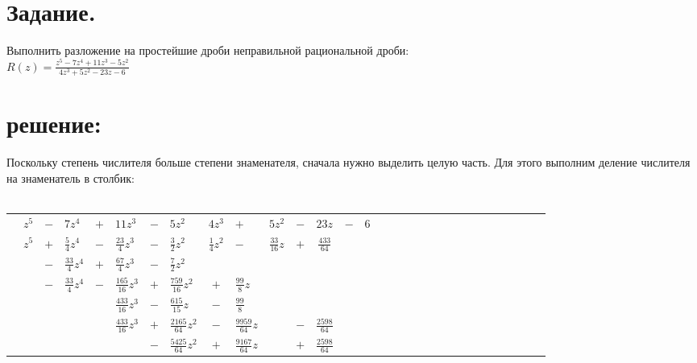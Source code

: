 \documentclass[12pt, a4paper]{article}
\begin{document}
\section{Задание.}
    Выполнить разложение на простейшие дроби неправильной рациональной дроби:\\
    $R(z) = \frac{z^5 - 7z^4 + 11z^3 - 5z^2}{4z^3 + 5z^2 - 23z - 6}$
    \section*{решение:}
    Поскольку степень числителя больше степени знаменателя, сначала
    нужно выделить целую часть. Для этого
    выполним деление числителя на знаменатель в столбик:\\\\
    \begin{spacing}{1.4}
        \begin{tabular}{*{15}{cp{0.55cm}}}
            &$z^5$             & $-$ & $7z^4$            & $+$ & $11z^3$             & $-$ & $5z^2$               &\vline   
            $4z^3$            & $+$ & $5z^2$            & $-$ & $23z$               & $-$ & $6$\\
            \cline{1-1}\cline{9-15}
            &$z^5$             & $+$ & $\frac{5}{4}z^4$  & $-$ & $\frac{23}{4}z^3$   & $-$ & $\frac{3}{2}z^2$     &\vline
            $\frac{1}{4}z^2$  & $-$ & $\frac{33}{16}z$  & $+$ & $\frac{433}{64}$    &     &\\
            \cline{2-8}
            &                  & $-$ & $\frac{33}{4}z^4$ & $+$ & $\frac{67}{4}z^3$   & $-$ & $\frac{7}{2}z^2$     &
                              &     &                   &     &                     &     &\\
            \cline{1-1}
            &                  & $-$ & $\frac{33}{4}z^4$ & $-$ & $\frac{165}{16}z^3$ & $+$ & $\frac{759}{16}z^2$  &
            $+$               & $\frac{99}{8}z$    &    &     &                     &     &\\
            \cline{4-10}
            &                  &     &                   &     & $\frac{433}{16}z^3$ & $-$ & $\frac{615}{15}z$    &
            $-$               & $\frac{99}{8}$     &    &     &                     &     &\\
            \cline{1-1}
            &                  &     &                   &     & $\frac{433}{16}z^3$ & $+$ & $\frac{2165}{64}z^2$ &
            $-$               & $\frac{9959}{64}z$ &    & $-$ & $\frac{2598}{64}$   &     &\\
            \cline{6-13}
            &                  &     &                   &     &                     & $-$ & $\frac{5425}{64}z^2$ &
            $+$               & $\frac{9167}{64}z$ &    & $+$ & $\frac{2598}{64}$   &     &\\
        \end{tabular}\\\\ 
    \end{spacing}
\end{document}
